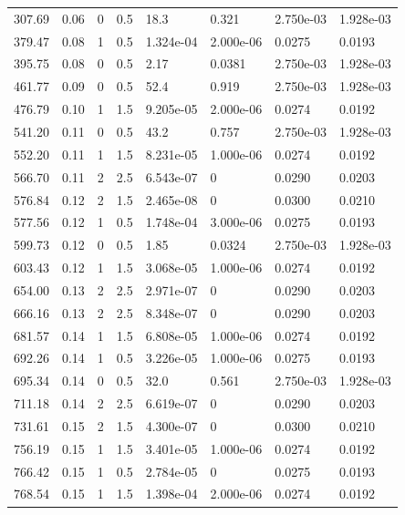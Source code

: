 \documentclass[preview]{standalone}
\begin{document}
{{\begin{tabular}{L{1.2cm}C{1.2cm} C{0.3cm}C{0.5cm} C{1.4cm}C{1.4cm} C{1.4cm}C{1.4cm}}
  307.69  &  0.06  & 0     & 0.5 &  18.3  & 0.321  & 2.750e-03 &  1.928e-03   \\ 
  379.47  &  0.08  & 1     & 0.5 &  1.324e-04  & 2.000e-06  & 0.0275 &  0.0193   \\ 
  395.75  &  0.08  & 0     & 0.5 &  2.17  & 0.0381  & 2.750e-03 &  1.928e-03   \\ 
  461.77  &  0.09  & 0     & 0.5 &  52.4  & 0.919  & 2.750e-03 &  1.928e-03   \\ 
  476.79  &  0.10  & 1     & 1.5 &  9.205e-05  & 2.000e-06  & 0.0274 &  0.0192   \\ 
  541.20  &  0.11  & 0     & 0.5 &  43.2  & 0.757  & 2.750e-03 &  1.928e-03   \\ 
  552.20  &  0.11  & 1     & 1.5 &  8.231e-05  & 1.000e-06  & 0.0274 &  0.0192   \\ 
  566.70  &  0.11  & 2     & 2.5 &  6.543e-07  & 0  & 0.0290 &  0.0203   \\ 
  576.84  &  0.12  & 2     & 1.5 &  2.465e-08  & 0  & 0.0300 &  0.0210   \\ 
  577.56  &  0.12  & 1     & 0.5 &  1.748e-04  & 3.000e-06  & 0.0275 &  0.0193   \\ 
  599.73  &  0.12  & 0     & 0.5 &  1.85  & 0.0324  & 2.750e-03 &  1.928e-03   \\ 
  603.43  &  0.12  & 1     & 1.5 &  3.068e-05  & 1.000e-06  & 0.0274 &  0.0192   \\ 
  654.00  &  0.13  & 2     & 2.5 &  2.971e-07  & 0  & 0.0290 &  0.0203   \\ 
  666.16  &  0.13  & 2     & 2.5 &  8.348e-07  & 0  & 0.0290 &  0.0203   \\ 
  681.57  &  0.14  & 1     & 1.5 &  6.808e-05  & 1.000e-06  & 0.0274 &  0.0192   \\ 
  692.26  &  0.14  & 1     & 0.5 &  3.226e-05  & 1.000e-06  & 0.0275 &  0.0193   \\ 
  695.34  &  0.14  & 0     & 0.5 &  32.0  & 0.561  & 2.750e-03 &  1.928e-03   \\ 
  711.18  &  0.14  & 2     & 2.5 &  6.619e-07  & 0  & 0.0290 &  0.0203   \\ 
  731.61  &  0.15  & 2     & 1.5 &  4.300e-07  & 0  & 0.0300 &  0.0210   \\ 
  756.19  &  0.15  & 1     & 1.5 &  3.401e-05  & 1.000e-06  & 0.0274 &  0.0192   \\ 
  766.42  &  0.15  & 1     & 0.5 &  2.784e-05  & 0  & 0.0275 &  0.0193   \\ 
  768.54  &  0.15  & 1     & 1.5 &  1.398e-04  & 2.000e-06  & 0.0274 &  0.0192   \\ 

\end{tabular}}}
\end{document}
